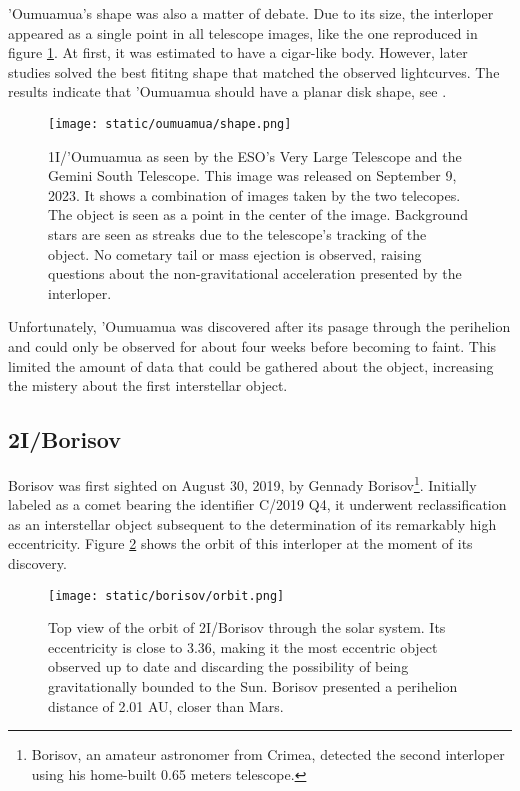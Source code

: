 'Oumuamua's shape was also a matter of debate. Due to its size, the interloper
appeared as a single point in all telescope images, like the one reproduced in
figure \ref{fig:oumuamua_shape}. At first, it was estimated to have a cigar-like
body. However, later studies solved the best fititng shape that matched the
observed lightcurves. The results indicate that 'Oumuamua should have a planar
disk shape, see \cite{seligman2022}.

\begin{figure}[H]
  \centering
  \texttt{[image: static/oumuamua/shape.png]}
\caption['Oumuamua as seen by the ESO's VLT and GST telescopes]{
  1I/'Oumuamua as seen by the ESO's Very Large Telescope and the Gemini South
  Telescope. This image was released on September 9, 2023. It shows a
  combination of images taken by the two telecopes. The object is seen as
  a point in the center of the image. Background stars are seen as streaks
  due to the telescope's tracking of the object. No cometary tail or mass
  ejection is observed, raising questions about the non-gravitational
  acceleration presented by the interloper.
  }
  \label{fig:oumuamua_shape}
\end{figure}

Unfortunately, 'Oumuamua was discovered after its pasage through the perihelion
and could only be observed for about four weeks before becoming to faint. This
limited the amount of data that could be gathered about the object, increasing
the mistery about the first interstellar object.

\subsection{2I/Borisov}

Borisov was first sighted on August 30, 2019, by Gennady
Borisov\footnote{Borisov, an amateur astronomer from Crimea, detected the second
interloper using his home-built 0.65 meters telescope.}. Initially labeled as a
comet bearing the identifier C/2019 Q4, it underwent reclassification as an
interstellar object subsequent to the determination of its remarkably high
eccentricity. Figure \ref{fig:borisov_orbit} shows the orbit of this interloper
at the moment of its discovery.

\begin{figure}[H]
  \centering
  \texttt{[image: static/borisov/orbit.png]}
  \caption[Top view of the orbit of 2I/Borisov through the solar system]{
    Top view of the orbit of 2I/Borisov through the solar system. Its eccentricity is
    close to 3.36, making it the most eccentric object observed up to date
    and discarding the possibility of being gravitationally bounded to the Sun.
    Borisov presented a perihelion distance of 2.01 AU, closer than Mars.
  }
  \label{fig:borisov_orbit}
\end{figure}


